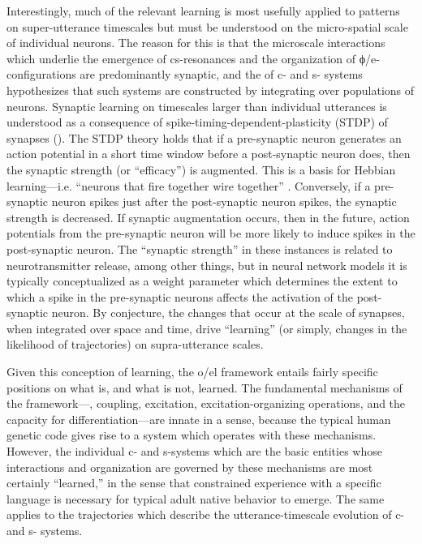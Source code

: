 Interestingly, much of the relevant learning is most usefully applied to patterns on super-utterance timescales but must be understood on the micro-spatial scale of individual neurons. The reason for this is that the microscale interactions which underlie the emergence of cs-resonances and the organization of ϕ/e-configurations are predominantly synaptic, and the  of c- and s- systems hypothesizes that such systems are constructed by integrating over populations of neurons. Synaptic learning on timescales larger than individual utterances is understood as a consequence of spike-timing-dependent-plasticity (STDP) of synapses (\citealt{AbbottNelson2000,MarkramEtAl1997}). The STDP theory holds that if a pre-synaptic neuron generates an action potential in a short time window before a post-synaptic neuron does, then the synaptic strength (or “efficacy”) is augmented. This is a basis for Hebbian learning—i.e. “neurons that fire together wire together” \citep{SongEtAl2000}. Conversely, if a pre-synaptic neuron spikes just after the post-synaptic neuron spikes, the synaptic strength is decreased. If synaptic augmentation occurs, then in the future, action potentials from the pre-synaptic neuron will be more likely to induce spikes in the post-synaptic neuron. The “synaptic strength” in these instances is related to neurotransmitter release, among other things, but in neural network models it is typically conceptualized as a weight parameter which determines the extent to which a spike in the pre-synaptic neurons affects the activation of the post-synaptic neuron. By conjecture, the changes that occur at the scale of synapses, when integrated over space and time, drive “learning” (or simply, changes in the likelihood of  trajectories) on supra-utterance scales. 

  Given this conception of learning, the o/el framework entails fairly specific positions on what is, and what is not, learned. The fundamental mechanisms of the framework—, coupling, excitation, excitation-organizing operations, and the capacity for differentiation—are innate in a sense, because the typical human genetic code gives rise to a system which operates with these mechanisms. However, the individual c- and s-systems which are the basic entities whose interactions and organization are governed by these mechanisms are most certainly “learned,” in the sense that constrained experience with a specific language is necessary for typical adult native  behavior to emerge. The same applies to the  trajectories which describe the utterance-timescale evolution of c- and s- systems.

